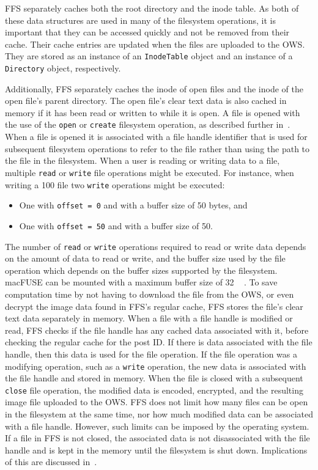 \gls{FFS} separately caches both the root directory and the inode table. As both of these data structures are used in many of the filesystem operations, it is important that they can be accessed quickly and not be removed from their cache. Their cache entries are updated when the files are uploaded to the \gls{OWS}. They are stored as an instance of an \texttt{InodeTable} object and an instance of a \texttt{Directory} object, respectively.

Additionally, \gls{FFS} separately caches the inode of open files and the inode of the open file's parent directory. The open file's clear text data is also cached in memory if it has been read or written to while it is open. A file is opened with the use of the \texttt{open} or \texttt{create} filesystem operation, as described further in~. When a file is opened it is associated with a file handle identifier that is used for subsequent filesystem operations to refer to the file rather than using the path to the file in the filesystem. When a user is reading or writing data to a file, multiple \texttt{read} or \texttt{write} file operations might be executed. For instance, when writing a \SI{100}{\byte} file two \texttt{write} operations might be executed:
\begin{itemize}
	\item One with \texttt{offset = 0} and with a buffer size of \SI{50}{\byte} bytes, and
	\item One with \texttt{offset = 50} and with a buffer size of \SI{50}{\byte}.
\end{itemize}
The number of \texttt{read} or \texttt{write} operations required to read or write data depends on the amount of data to read or write, and the buffer size used by the file operation which depends on the buffer sizes supported by the filesystem. macFUSE can be mounted with a maximum buffer size of \SI{32}{\mega\byte}\,\cite{fleischerMountOptionsOsxfuse2020}. To save computation time by not having to download the file from the \gls{OWS}, or even decrypt the image data found in \gls{FFS}'s regular cache, \gls{FFS} stores the file's clear text data separately in memory. When a file with a file handle is modified or read, \gls{FFS} checks if the file handle has any cached data associated with it, before checking the regular cache for the post ID. If there is data associated with the file handle, then this data is used for the file operation. If the file operation was a modifying operation, such as a \texttt{write} operation, the new data is associated with the file handle and stored in memory. When the file is closed with a subsequent \texttt{close} file operation, the modified data is encoded, encrypted, and the resulting image file uploaded to the \gls{OWS}. \gls{FFS} does not limit how many files can be open in the filesystem at the same time, nor how much modified data can be associated with a file handle. However, such limits can be imposed by the operating system. If a file in \gls{FFS} is not closed, the associated data is not disassociated with the file handle and is kept in the memory until the filesystem is shut down. Implications of this are discussed in~.

